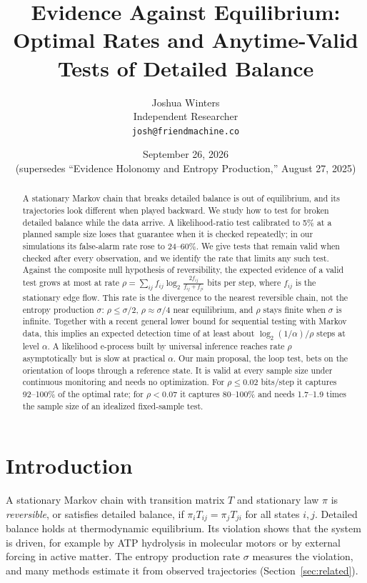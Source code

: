 \documentclass[11pt]{article}
\title{Evidence Against Equilibrium:\\
Optimal Rates and Anytime-Valid Tests of Detailed Balance}
\author{Joshua Winters\\Independent Researcher\\\texttt{josh@friendmachine.co}}
\date{September 26, 2026\\\small (supersedes ``Evidence Holonomy and Entropy Production,'' August 27, 2025)}
\theoremstyle{definition}
\theoremstyle{remark}
\begin{document}
\maketitle

\begin{abstract}
A stationary Markov chain that breaks detailed balance is out of equilibrium, and its trajectories look different when played backward. We study how to test for broken detailed balance while the data arrive. A likelihood-ratio test calibrated to 5\% at a planned sample size loses that guarantee when it is checked repeatedly; in our simulations its false-alarm rate rose to 24--60\%. We give tests that remain valid when checked after every observation, and we identify the rate that limits any such test. Against the composite null hypothesis of reversibility, the expected evidence of a valid test grows at most at rate $\rho=\sum_{ij}f_{ij}\log_2\frac{2f_{ij}}{f_{ij}+f_{ji}}$ bits per step, where $f_{ij}$ is the stationary edge flow. This rate is the divergence to the nearest reversible chain, not the entropy production $\sigma$: $\rho\le\sigma/2$, $\rho\approx\sigma/4$ near equilibrium, and $\rho$ stays finite when $\sigma$ is infinite. Together with a recent general lower bound for sequential testing with Markov data, this implies an expected detection time of at least about $\log_2(1/\alpha)/\rho$ steps at level $\alpha$. A likelihood e-process built by universal inference reaches rate $\rho$ asymptotically but is slow at practical $\alpha$. Our main proposal, the loop test, bets on the orientation of loops through a reference state. It is valid at every sample size under continuous monitoring and needs no optimization. For $\rho\le0.02$ bits/step it captures 92--100\% of the optimal rate; for $\rho<0.07$ it captures 80--100\% and needs 1.7--1.9 times the sample size of an idealized fixed-sample test.
\end{abstract}

\section{Introduction}

A stationary Markov chain with transition matrix $T$ and stationary law $\pi$ is \emph{reversible}, or satisfies detailed balance, if $\pi_iT_{ij}=\pi_jT_{ji}$ for all states $i,j$. Detailed balance holds at thermodynamic equilibrium. Its violation shows that the system is driven, for example by ATP hydrolysis in molecular motors or by external forcing in active matter. The entropy production rate $\sigma$ measures the violation, and many methods estimate it from observed trajectories (Section~\ref{sec:related}).
\end{document}
